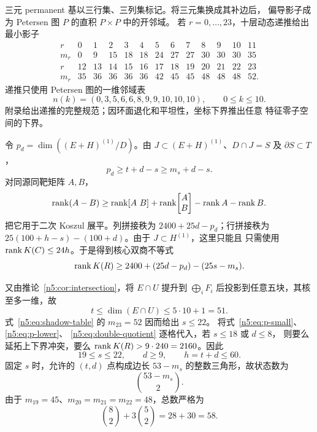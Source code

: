 三元 permanent 基以三行集、三列集标记。将三元集换成其补边后，
偏导影子成为 Petersen 图 \(P\) 的直积 \(P\times P\) 中的开邻域。
若 \(r=0,\ldots,23\)，十层动态递推给出最小影子
\begin{equation}\label{n5:eq:shadow-table}
\begin{array}{c|rrrrrrrrrrrr}
r&0&1&2&3&4&5&6&7&8&9&10&11\\ \hline
m_r&0&9&15&18&18&24&27&27&30&30&30&35\\[1mm]
r&12&13&14&15&16&17&18&19&20&21&22&23\\ \hline
m_r&35&36&36&36&36&42&45&45&48&48&48&52.
\end{array}
\end{equation}
递推只使用 Petersen 图的一维邻域表
\[
 n(k)=(0,3,5,6,6,8,9,9,10,10,10),\qquad0\le k\le10.
\]
附录给出递推的完整规范；因环面退化和平坦性，坐标下界推出任意
特征零子空间的下界。

令 \(p_d=\dim((E+H)^{(1)}/D)\)。由
\(J\subset(E+H)^{(1)}\)、\(D\cap J=S\) 及
\(\partial S\subset T\)，
\begin{equation}\label{n5:eq:p-lower}
 p_d\ge t+d-s\ge m_s+d-s.
\end{equation}
对同源同靶矩阵 \(A,B\)，
\[
 \rank(A-B)\ge \rank[A\ B]+\rank\!\begin{bmatrix}A\\B\end{bmatrix}
 -\rank A-\rank B.
\]
把它用于二次 Koszul 展平。列拼接秩为
\(2400+25d-p_d\)；行拼接秩为
\(25(100+h-s)-(100+d)\)。由于 \(J\subset H^{(1)}\)，这里只能且
只需使用 \(\operatorname{rank} K(C)\le24h\)。于是得到核心双商不等式
\begin{equation}\label{n5:eq:double-quotient}
 \operatorname{rank} K(R)\ge2400+(25d-p_d)-(25s-m_s).
\end{equation}

又由推论~\ref{n5:cor:intersection}，将 \(E\cap U\) 提升到
\(\bigoplus_iF_i\) 后投影到任意五块，其核至多一维，故
\begin{equation}\label{n5:eq:t51}
 t\le\dim(E\cap U)\le5\cdot10+1=51.
\end{equation}
式~\eqref{n5:eq:shadow-table} 的 \(m_{23}=52\) 因而给出 \(s\le22\)。
将式~\eqref{n5:eq:p-small}、\eqref{n5:eq:p-lower}、
\eqref{n5:eq:double-quotient} 逐格代入，若 \(s\le18\) 或 \(d\le8\)，
则要么延拓上下界冲突，要么
\(\operatorname{rank} K(R)>9\cdot240=2160\)。因此
\[
 19\le s\le22,\qquad d\ge9,\qquad h=t+d\le60.
\]
固定 \(s\) 时，允许的 \((t,d)\) 点构成边长
\(53-m_s\) 的整数三角形，故状态数为
\[
 \binom{53-m_s}{2}.
\]
由于 \(m_{19}=45\)、\(m_{20}=m_{21}=m_{22}=48\)，总数严格为
\[
 \binom82+3\binom52=28+30=58.
\]

